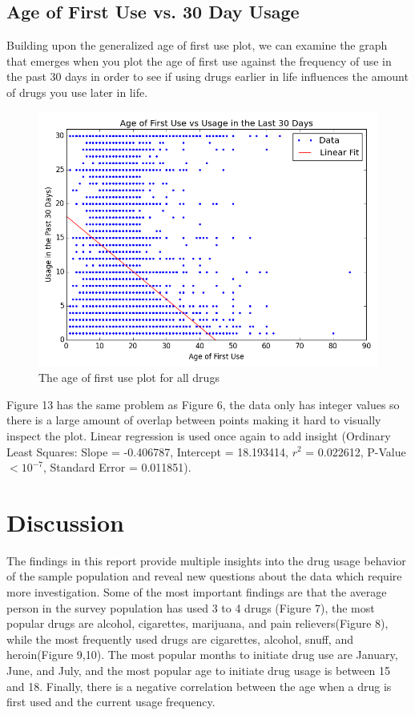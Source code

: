 \documentclass[a4 paper]{article}
\begin{document}
\subsection*{Age of First Use vs. 30 Day Usage}
Building upon the generalized age of first use plot, we can examine the graph that emerges when you plot the age of first use against the frequency of use in the past 30 days in order to see if using drugs earlier in life influences the amount of drugs you use later in life.

\begin{figure}[H]
	\centering
	\includegraphics[width=5in]{images/afuVsUse30}
	\caption{The age of first use plot for all drugs}
\end{figure}

Figure 13 has the same problem as Figure 6, the data only has integer values so there is a large amount of overlap between points making it hard to visually inspect the plot. Linear regression is used once again to add insight (Ordinary Least Squares: Slope = -0.406787, Intercept = 18.193414, $r^2$ = 0.022612, P-Value $< 10^{-7}$, Standard Error = 0.011851). \\


\section*{Discussion}
The findings in this report provide multiple insights into the drug usage behavior of the sample population and reveal new questions about the data which require more investigation. Some of the most important findings are that the average person in the survey population has used 3 to 4 drugs (Figure 7), the most popular drugs are alcohol, cigarettes, marijuana, and pain relievers(Figure 8), while the most frequently used drugs are cigarettes, alcohol, snuff, and heroin(Figure 9,10). The most popular months to initiate drug use are January, June, and July, and the most popular age to initiate drug usage is between 15 and 18. Finally, there is a negative correlation between the age when a drug is first used and the current usage frequency.\\
\end{document}
